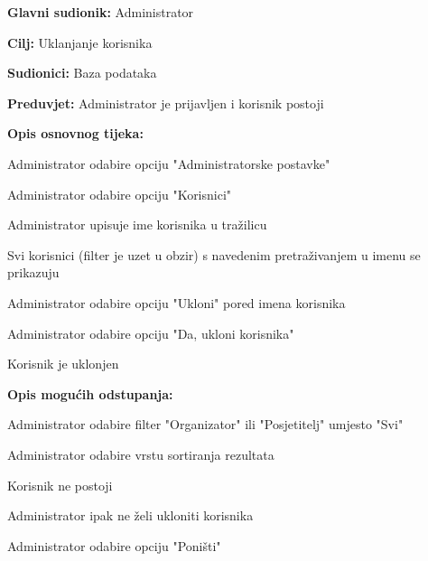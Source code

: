 					\noindent {}
					\begin{packed_item}
	
						\item \textbf{Glavni sudionik:} Administrator
						\item  \textbf{Cilj:} Uklanjanje korisnika
						\item  \textbf{Sudionici:} Baza podataka
						\item  \textbf{Preduvjet:} Administrator je prijavljen i korisnik postoji
						\item  \textbf{Opis osnovnog tijeka:}
						
						\item[] \begin{packed_enum}
	
							\item Administrator odabire opciju "Administratorske postavke"
							\item Administrator odabire opciju "Korisnici"
							\item Administrator upisuje ime korisnika u tražilicu
							\item Svi korisnici (filter je uzet u obzir) s navedenim pretraživanjem u imenu se prikazuju
							\item Administrator odabire opciju "Ukloni" pored imena korisnika
							\item Administrator odabire opciju "Da, ukloni korisnika"
							\item Korisnik je uklonjen
						\end{packed_enum}
						
						\item  \textbf{Opis mogućih odstupanja:}
						
						\item[] \begin{packed_item}
						
							\item[3.a] Administrator odabire filter "Organizator" ili "Posjetitelj" umjesto "Svi"
							\item[3.b] Administrator odabire vrstu sortiranja rezultata
							\item[4.a] Korisnik ne postoji
							\item[5.a] Administrator ipak ne želi ukloniti korisnika
							\item[] \begin{packed_enum}
								
								\item Administrator odabire opciju "Poništi"
								
							\end{packed_enum}
						\end{packed_item}
					\end{packed_item}

